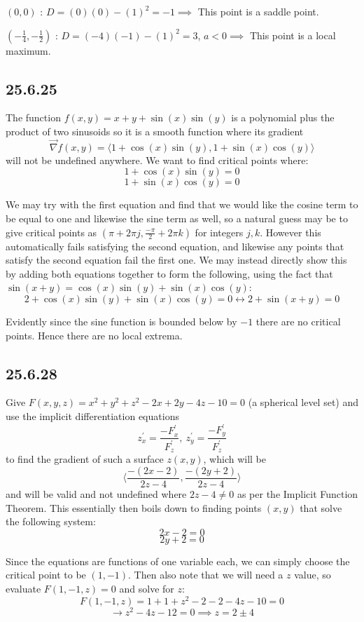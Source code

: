 \documentclass{article}
\begin{document}
$(0,0)$ : $D = (0)(0)-(1)^2 = -1 \implies$ This point is a saddle point.

$(-\frac{1}{4}, -\frac{1}{2})$ : $D = (-4)(-1)-(1)^2 = 3$, $a < 0 \implies$ This point is a local maximum.

\subsection{25.6.25}

The function $f(x,y) = x + y + \sin(x) \sin(y)$ is a polynomial plus the product of two sinusoids so it is a smooth function where its gradient $$\vec{\nabla}f(x,y) = \langle 1 + \cos(x)\sin(y),1 + \sin(x)\cos(y) \rangle$$ will not be undefined anywhere. We want to find critical points where:
$$1 + \cos(x)\sin(y) = 0$$
$$1 + \sin(x)\cos(y) = 0$$

We may try with the first equation and find that we would like the cosine term to be equal to one and likewise the sine term as well, so a natural guess may be to give critical points as $(\pi + 2\pi j, \frac{-\pi}{2}+2\pi k)$ for integers $j,k$. However this automatically fails satisfying the second equation, and likewise any points that satisfy the second equation fail the first one. We may instead directly show this by adding both equations together to form the following, using the fact that $\sin(x+y) = \cos(x)\sin(y) + \sin(x)\cos(y)$:
$$2 + \cos(x)\sin(y) + \sin(x)\cos(y) = 0 \leftrightarrow 2 + \sin(x+y) = 0$$

Evidently since the sine function is bounded below by $-1$ there are no critical points. Hence there are no local extrema.

\subsection{25.6.28}

Give $F(x,y,z) = x^2 + y^2 + z^2 - 2x + 2y - 4z - 10 = 0$ (a spherical level set) and use the implicit differentiation equations $$z^{\prime}_x = \frac{-F^{\prime}_x}{F^{\prime}_z},~ z^{\prime}_y = \frac{-F^{\prime}_y}{F^{\prime}_z}$$ to find the gradient of such a surface $z(x,y)$, which will be $$\langle \frac{-(2x-2)}{2z-4},\frac{-(2y+2)}{2z-4} \rangle$$ and will be valid and not undefined where $2z-4 \neq 0$ as per the Implicit Function Theorem. This essentially then boils down to finding points $(x,y)$ that solve the following system:
$$2x-2 = 0$$
$$2y+2 = 0$$

Since the equations are functions of one variable each, we can simply choose the critical point to be $(1,-1)$. Then also note that we will need a $z$ value, so evaluate $F(1,-1,z) = 0$ and solve for $z$:
$$F(1,-1,z) = 1+1+z^2-2-2-4z-10 = 0$$
$$\to z^2-4z-12 = 0 \implies z = 2 \pm 4$$
\end{document}
